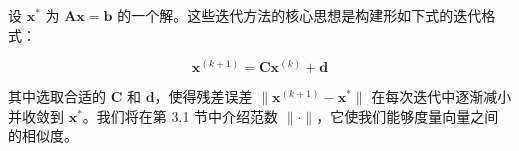 设 $ \boldsymbol{x}^* $ 为 $ \boldsymbol {Ax} = \boldsymbol{b} $ 的一个解。这些迭代方法的核心思想是构建形如下式的迭代格式：

\begin{equation}
\boldsymbol{x}^{(k+1)} = \boldsymbol{C} \boldsymbol{x}^{(k)} + \boldsymbol{d}
\tag{2.60}\label{eq:2-60}
\end{equation}

其中选取合适的 $ \boldsymbol{C} $ 和 $ \boldsymbol{d} $，使得残差误差 $ \| \boldsymbol{x}^{(k+1)} - \boldsymbol{x}^* \| $ 在每次迭代中逐渐减小并收敛到 $ \boldsymbol{x}^* $。我们将在第 3.1 节中介绍范数 $ \| \cdot \| $，它使我们能够度量向量之间的相似度。
